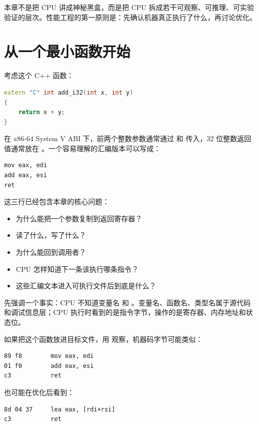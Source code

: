 \begin{keyidea}
本章不是把 CPU 讲成神秘黑盒，而是把 CPU 拆成若干可观察、可推理、可实验验证的层次。性能工程的第一原则是：先确认机器真正执行了什么，再讨论优化。
\end{keyidea}

\section{从一个最小函数开始}

考虑这个 C++ 函数：

\begin{lstlisting}[language=C++]
extern "C" int add_i32(int x, int y)
{
    return x + y;
}
\end{lstlisting}

在 x86-64 System V ABI 下，前两个整数参数通常通过  和  传入，32 位整数返回值通常放在 。一个容易理解的汇编版本可以写成：

\begin{lstlisting}
mov eax, edi
add eax, esi
ret
\end{lstlisting}

这三行已经包含本章的核心问题：

\begin{itemize}
  \item {} 为什么能把一个参数复制到返回寄存器？
  \item {} 读了什么，写了什么？
  \item {} 为什么能回到调用者？
  \item CPU 怎样知道下一条该执行哪条指令？
  \item 这些汇编文本进入可执行文件后到底是什么？
\end{itemize}

先强调一个事实：CPU 不知道变量名  和 。变量名、函数名、类型名属于源代码和调试信息层；CPU 执行时看到的是指令字节，操作的是寄存器、内存地址和状态位。

如果把这个函数放进目标文件，用  观察，机器码字节可能类似：

\begin{lstlisting}
89 f8        mov eax, edi
01 f0        add eax, esi
c3           ret
\end{lstlisting}

也可能在优化后看到：

\begin{lstlisting}
8d 04 37     lea eax, [rdi+rsi]
c3           ret
\end{lstlisting}

